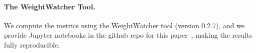 \paragraph{The WeightWatcher Tool.}

We compute the metrics using the WeightWatcher tool (version 0.2.7), and we provide Jupyter notebooks in the github repo for this paper~\cite{repo}, making the results fully reproducible.


